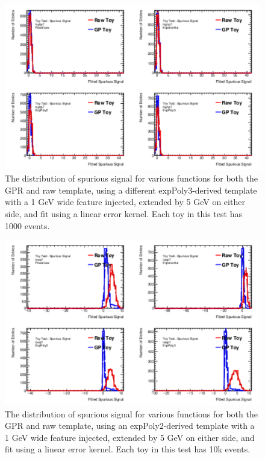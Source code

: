 \begin{figure} 
\begin{center}
  \includegraphics[width=\textwidth]{figures/background/gpr/validation/linear/ToyTest_FitSigVals_highpT_1000_Sig_1s}   
\caption{The distribution of spurious signal for various functions for both the GPR and raw template, using a different expPoly3-derived template with a 1 GeV wide feature injected, extended by 5 GeV on either side, and fit using a linear error kernel. Each toy in this test has 1000 events.}
\label{fig:linearkernel_highpt_1000_Sig_1s}
\end{center}
\end{figure}

\begin{figure} 
\begin{center}
  \includegraphics[width=\textwidth]{figures/background/gpr/validation/linear/ToyTest_FitSigVals_lowpT_10k_Sig_1s}   
\caption{The distribution of spurious signal for various functions for both the GPR and raw template, using an expPoly2-derived template with a 1 GeV wide feature injected, extended by 5 GeV on either side, and fit using a linear error kernel. Each toy in this test has 10k events.}
\label{fig:linearkernel_lowpt_10k_Sig_1s}
\end{center}
\end{figure}

